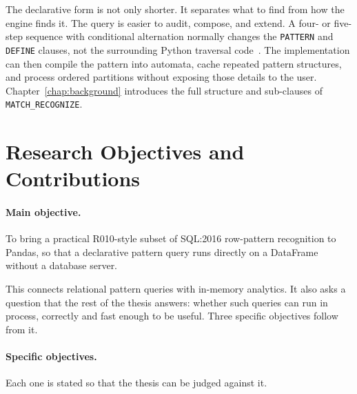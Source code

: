 The declarative form is not only shorter.  It separates what to find from how
the engine finds it.  The query is easier to audit, compose, and extend.  A
four- or five-step sequence with conditional alternation normally changes the
\texttt{PATTERN} and \texttt{DEFINE} clauses, not the surrounding Python
traversal code~\cite{michels2018new,petkovic2022rpr}.  The implementation can
then compile the pattern into automata, cache repeated pattern structures,
and process ordered partitions without exposing those details to the user.
Chapter~\ref{chap:background} introduces the full structure and
sub-clauses of \texttt{MATCH\_RECOGNIZE}.
\section{Research Objectives and Contributions}
\label{sec:intro-objectives}
\paragraph{Main objective.}
To bring a practical R010-style subset of SQL:2016 row-pattern recognition to
Pandas, so that a declarative pattern query runs directly on a DataFrame
without a database server.

This connects relational pattern queries with in-memory analytics.  It also
asks a question that the rest of the thesis answers: whether such queries can
run in process, correctly and fast enough to be useful.  Three specific
objectives follow from it.

\paragraph{Specific objectives.}
Each one is stated so that the thesis can be judged against it.

